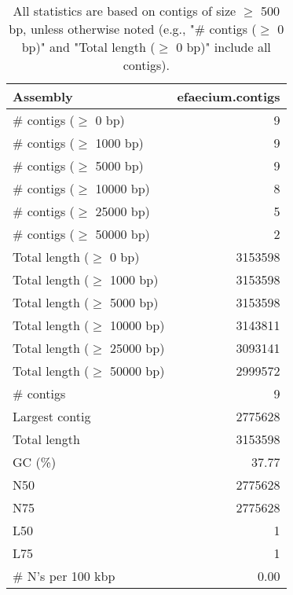 \documentclass[12pt,a4paper]{article}
\begin{document}
\begin{table}[ht]
\begin{center}
\caption{All statistics are based on contigs of size $\geq$ 500 bp, unless otherwise noted (e.g., "\# contigs ($\geq$ 0 bp)" and "Total length ($\geq$ 0 bp)" include all contigs).}
\begin{tabular}{|l*{1}{|r}|}
\hline
Assembly & efaecium.contigs \\ \hline
\# contigs ($\geq$ 0 bp) & 9 \\ \hline
\# contigs ($\geq$ 1000 bp) & 9 \\ \hline
\# contigs ($\geq$ 5000 bp) & 9 \\ \hline
\# contigs ($\geq$ 10000 bp) & 8 \\ \hline
\# contigs ($\geq$ 25000 bp) & 5 \\ \hline
\# contigs ($\geq$ 50000 bp) & 2 \\ \hline
Total length ($\geq$ 0 bp) & 3153598 \\ \hline
Total length ($\geq$ 1000 bp) & 3153598 \\ \hline
Total length ($\geq$ 5000 bp) & 3153598 \\ \hline
Total length ($\geq$ 10000 bp) & 3143811 \\ \hline
Total length ($\geq$ 25000 bp) & 3093141 \\ \hline
Total length ($\geq$ 50000 bp) & 2999572 \\ \hline
\# contigs & 9 \\ \hline
Largest contig & 2775628 \\ \hline
Total length & 3153598 \\ \hline
GC (\%) & 37.77 \\ \hline
N50 & 2775628 \\ \hline
N75 & 2775628 \\ \hline
L50 & 1 \\ \hline
L75 & 1 \\ \hline
\# N's per 100 kbp & 0.00 \\ \hline
\end{tabular}
\end{center}
\end{table}
\end{document}
